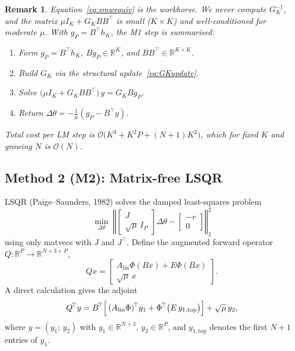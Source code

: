 \documentclass[11pt,a4paper]{article}
\newcommand{\R}{\mathbb{R}}
\newcommand{\Order}{\mathcal{O}}
\newcommand{\Alin}{A_{\mathrm{lin}}}
\newcommand{\GK}{G_{K}}
\newcommand{\hK}{h_{K}}
\newcommand{\Bt}{B^{\!\top}}
\newcommand{\Jt}{J^{\!\top}}
\newcommand{\Phit}{\Phi^{\!\top}}
\newtheorem{remark}{Remark}
\begin{document}
\begin{remark}
Equation~\eqref{eq:smwequiv} is the workhorse. We never compute $\GK^{-1}$, and
the matrix $\mu I_{K} + \GK B\Bt$ is small ($K\times K$) and well-conditioned for
moderate $\mu$. With $g_{P} = \Bt \hK$, the M1 step is summarised:
\begin{enumerate}
    \item Form $g_{P} = \Bt \hK$, $B g_{P}\in\R^{K}$, and $B\Bt\in\R^{K\times K}$.
    \item Build $\GK$ via the structural update~\eqref{eq:GKupdate}.
    \item Solve $\bigl(\mu I_{K} + \GK B\Bt\bigr)\, y = \GK B g_{P}$.
    \item Return $\Delta\theta = -\tfrac{1}{\mu}(g_{P} - \Bt y)$.
\end{enumerate}
Total cost per LM step is $\Order\bigl(K^{3} + K^{2}P + (N+1)K^{2}\bigr)$, which
for fixed $K$ and growing $N$ is $\Order(N)$.
\end{remark}

\subsection{Method 2 (M2): Matrix-free LSQR}
\label{sec:lsqr}

LSQR (Paige--Saunders, 1982) solves the damped least-squares problem
\begin{equation}
\min_{\Delta\theta}\;\left\Vert
\begin{bmatrix} J \\ \sqrt{\mu}\, I_{P} \end{bmatrix} \Delta\theta
-
\begin{bmatrix} -r \\ 0 \end{bmatrix}
\right\Vert_{2}^{2}
\label{eq:lsqr_obj}
\end{equation}
using only matvecs with $J$ and $\Jt$. Define the augmented forward operator
$Q: \R^{P}\to\R^{N+3+P}$,
\begin{equation}
Q x = \begin{bmatrix} \Alin\Phi (Bx) + E\Phi (Bx) \\ \sqrt{\mu}\, x \end{bmatrix}.
\label{eq:Qfwd}
\end{equation}
A direct calculation gives the adjoint
\begin{equation}
Q^{\!\top} y =
\Bt\Bigl[\,(\Alin\Phi)^{\!\top} y_{1} + \Phit\bigl(E\, y_{1,\mathrm{top}}\bigr)\Bigr]
+ \sqrt{\mu}\, y_{2},
\label{eq:Qadj}
\end{equation}
where $y = (y_{1};\, y_{2})$ with $y_{1}\in\R^{N+3}$, $y_{2}\in\R^{P}$, and
$y_{1,\mathrm{top}}$ denotes the first $N+1$ entries of $y_{1}$.
\end{document}
